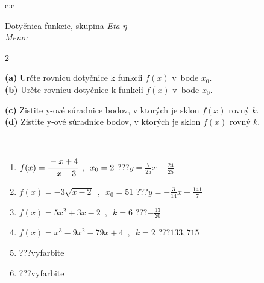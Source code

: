 \documentclass[10pt]{report}
\begin{document}
\begin{tabular}{c:c}
\begin{minipage}[c][104.5mm][t]{0.5\linewidth}
\begin{center}
\vspace{7mm}
{\huge Dotyčnica funkcie, skupina \textit{Eta $\eta$} -}\\[5mm]
\textit{Meno:}\phantom{xxxxxxxxxxxxxxxxxxxxxxxxxxxxxxxxxxxxxxxxxxxxxxxxxxxxxxxxxxxxxxxxx}\\[5mm]
\begin{minipage}{0.95\linewidth}
\begin{center}
{\small \begin{multicols}{2} \raggedright
\textbf{(a)} Určte rovnicu dotyčnice k funkcii \(f(x)\) v~bode \(x_0\). \\[1mm]
\textbf{(b)} Určte rovnicu dotyčnice k funkcii \(f(x)\) v~bode \(x_0\). \par \columnbreak
\textbf{(c)} Zistite y-ové súradnice bodov, v ktorých je sklon \(f(x)\) rovný \(k\). \\[1mm]
\textbf{(d)} Zistite y-ové súradnice bodov, v ktorých je sklon \(f(x)\) rovný \(k\). \\[1mm]
\end{multicols}
}
\end{center}
\end{minipage}
\\[4mm]
\begin{minipage}{0.79\linewidth}
\begin{center}
\begin{varwidth}{\linewidth}
\begin{enumerate}
\normalsizerr
\item $f(x)=\cfrac{-x+4}{-x-3}\enspace , \enspace x_0=2$\quad \dotfill\; ???\;\dotfill \quad $y = \frac{7}{25}x-\frac{24}{25}$
\item $f(x)=-3\sqrt{x-2}\enspace , \enspace x_0=51$\quad \dotfill\; ???\;\dotfill \quad $y = -\frac{3}{14}x-\frac{141}{7}$
\item $f(x)=5x^2+3x-2\enspace , \enspace k=6$\quad \dotfill\; ???\;\dotfill \quad $-\frac{13}{20}$
\item $f(x)=x^3-9x^2-79x+4\enspace , \enspace k=2$\quad \dotfill\; ???\;\dotfill \quad $133 , 715$
\item \quad \dotfill\; ???\;\dotfill \quad vyfarbite
\item \quad \dotfill\; ???\;\dotfill \quad vyfarbite
\end{enumerate}
\end{varwidth}

\end{center}
\end{minipage}
\end{center}
\end{minipage}
\end{tabular}
\end{document}
